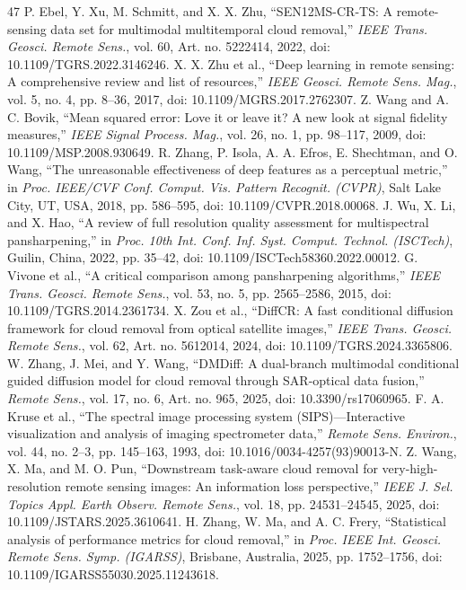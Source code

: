 \documentclass[a4paper,fleqn]{cas-dc}
\begin{document}
\begin{thebibliography}{47}
 P. Ebel, Y. Xu, M. Schmitt, and X. X. Zhu, ``SEN12MS-CR-TS: A remote-sensing data set for multimodal multitemporal cloud removal,'' \textit{IEEE Trans. Geosci. Remote Sens.}, vol. 60, Art. no. 5222414, 2022, doi: 10.1109/TGRS.2022.3146246.
 X. X. Zhu et al., ``Deep learning in remote sensing: A comprehensive review and list of resources,'' \textit{IEEE Geosci. Remote Sens. Mag.}, vol. 5, no. 4, pp. 8--36, 2017, doi: 10.1109/MGRS.2017.2762307.
 Z. Wang and A. C. Bovik, ``Mean squared error: Love it or leave it? A new look at signal fidelity measures,'' \textit{IEEE Signal Process. Mag.}, vol. 26, no. 1, pp. 98--117, 2009, doi: 10.1109/MSP.2008.930649.
 R. Zhang, P. Isola, A. A. Efros, E. Shechtman, and O. Wang, ``The unreasonable effectiveness of deep features as a perceptual metric,'' in \textit{Proc. IEEE/CVF Conf. Comput. Vis. Pattern Recognit. (CVPR)}, Salt Lake City, UT, USA, 2018, pp. 586--595, doi: 10.1109/CVPR.2018.00068.
 J. Wu, X. Li, and X. Hao, ``A review of full resolution quality assessment for multispectral pansharpening,'' in \textit{Proc. 10th Int. Conf. Inf. Syst. Comput. Technol. (ISCTech)}, Guilin, China, 2022, pp. 35--42, doi: 10.1109/ISCTech58360.2022.00012.
 G. Vivone et al., ``A critical comparison among pansharpening algorithms,'' \textit{IEEE Trans. Geosci. Remote Sens.}, vol. 53, no. 5, pp. 2565--2586, 2015, doi: 10.1109/TGRS.2014.2361734.
 X. Zou et al., ``DiffCR: A fast conditional diffusion framework for cloud removal from optical satellite images,'' \textit{IEEE Trans. Geosci. Remote Sens.}, vol. 62, Art. no. 5612014, 2024, doi: 10.1109/TGRS.2024.3365806.
 W. Zhang, J. Mei, and Y. Wang, ``DMDiff: A dual-branch multimodal conditional guided diffusion model for cloud removal through SAR-optical data fusion,'' \textit{Remote Sens.}, vol. 17, no. 6, Art. no. 965, 2025, doi: 10.3390/rs17060965.
 F. A. Kruse et al., ``The spectral image processing system (SIPS)---Interactive visualization and analysis of imaging spectrometer data,'' \textit{Remote Sens. Environ.}, vol. 44, no. 2--3, pp. 145--163, 1993, doi: 10.1016/0034-4257(93)90013-N.
 Z. Wang, X. Ma, and M. O. Pun, ``Downstream task-aware cloud removal for very-high-resolution remote sensing images: An information loss perspective,'' \textit{IEEE J. Sel. Topics Appl. Earth Observ. Remote Sens.}, vol. 18, pp. 24531--24545, 2025, doi: 10.1109/JSTARS.2025.3610641.
 H. Zhang, W. Ma, and A. C. Frery, ``Statistical analysis of performance metrics for cloud removal,'' in \textit{Proc. IEEE Int. Geosci. Remote Sens. Symp. (IGARSS)}, Brisbane, Australia, 2025, pp. 1752--1756, doi: 10.1109/IGARSS55030.2025.11243618.

\end{thebibliography}
\end{document}
